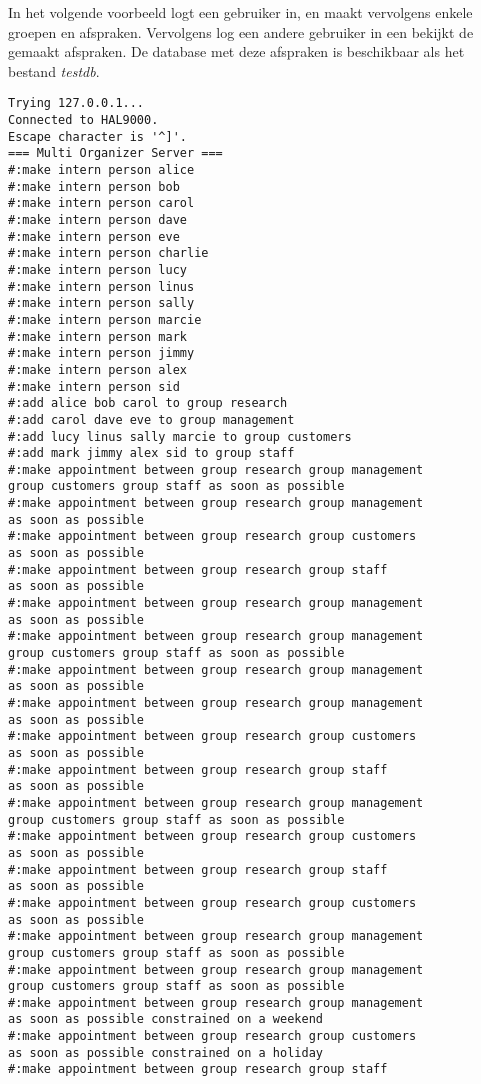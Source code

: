 \documentclass[a4paper]{article}
\begin{document}
In het volgende voorbeeld logt een gebruiker in, en maakt vervolgens enkele groepen en afspraken.
Vervolgens log een andere gebruiker in een bekijkt de gemaakt afspraken.
De database met deze afspraken is beschikbaar als het bestand {\em testdb}.

\begin{verbatim}
Trying 127.0.0.1...
Connected to HAL9000.
Escape character is '^]'.
=== Multi Organizer Server ===
#:make intern person alice
#:make intern person bob
#:make intern person carol
#:make intern person dave
#:make intern person eve
#:make intern person charlie
#:make intern person lucy
#:make intern person linus
#:make intern person sally
#:make intern person marcie
#:make intern person mark
#:make intern person jimmy
#:make intern person alex
#:make intern person sid
#:add alice bob carol to group research
#:add carol dave eve to group management
#:add lucy linus sally marcie to group customers
#:add mark jimmy alex sid to group staff
#:make appointment between group research group management 
group customers group staff as soon as possible
#:make appointment between group research group management 
as soon as possible
#:make appointment between group research group customers 
as soon as possible
#:make appointment between group research group staff 
as soon as possible
#:make appointment between group research group management 
as soon as possible
#:make appointment between group research group management 
group customers group staff as soon as possible
#:make appointment between group research group management 
as soon as possible
#:make appointment between group research group management 
as soon as possible
#:make appointment between group research group customers 
as soon as possible
#:make appointment between group research group staff 
as soon as possible
#:make appointment between group research group management 
group customers group staff as soon as possible
#:make appointment between group research group customers 
as soon as possible
#:make appointment between group research group staff 
as soon as possible
#:make appointment between group research group customers 
as soon as possible
#:make appointment between group research group management 
group customers group staff as soon as possible
#:make appointment between group research group management 
group customers group staff as soon as possible
#:make appointment between group research group management 
as soon as possible constrained on a weekend
#:make appointment between group research group customers 
as soon as possible constrained on a holiday
#:make appointment between group research group staff 

\end{verbatim}
\end{document}
